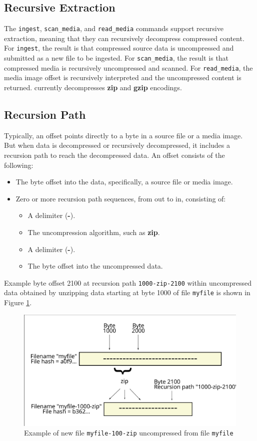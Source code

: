 \documentclass[11pt,fleqn]{article} %
\begin{document}
\subsection{Recursive Extraction}
The \hdb \verb+ingest+, \verb+scan_media+, and \verb+read_media+ commands support recursive extraction, meaning that they can recursively decompress compressed content. For \verb+ingest+, the result is that compressed source data is uncompressed and submitted as a new file to be ingested. For \verb+scan_media+, the result is that compressed media is recursively uncompressed and scanned. For \verb+read_media+, the media image offset is recursively interpreted and the uncompressed content is returned. \hdb currently decompresses \textbf{zip} and \textbf{gzip} encodings.

\subsection{Recursion Path}
Typically, an offset points directly to a byte in a source file or a media image. But when data is decompressed or recursively decompressed, it includes a recursion path to reach the decompressed data. An offset consists of the following:
\begin{itemize}
\item The byte offset into the data, specifically, a source file or media image.
\item Zero or more recursion path sequences, from out to in, consisting of:
  \begin{itemize}
  \item A delimiter (\textbf{-}).
  \item The uncompression algorithm, such as \textbf{zip}.
  \item A delimiter (\textbf{-}).
  \item The byte offset into the uncompressed data.
  \end{itemize}
\end{itemize}

Example byte offset 2100 at recursion path \verb+1000-zip-2100+ within uncompressed data obtained by unzipping data starting at byte 1000 of file \verb+myfile+ is shown in Figure \ref{fig:recursionPath}.

\begin{figure}
	\center
	\includegraphics[scale=.45]{drawings/recursion_path}
	\caption{Example of new file \texttt{myfile-100-zip} uncompressed from file \texttt{myfile}}
	\label{fig:recursionPath}
\end{figure}
\end{document}
